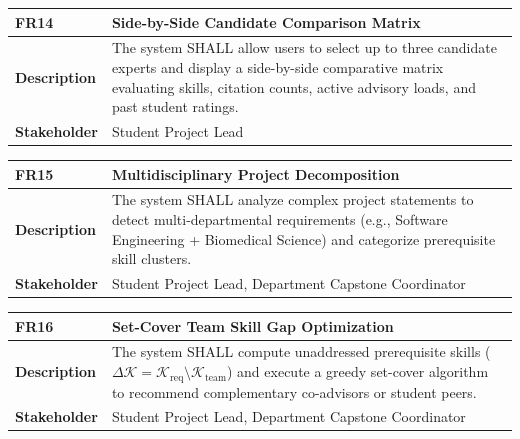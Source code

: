 \begin{table}[H]
\centering
\small
\begin{tabularx}{\textwidth}{|l|X|}
\hline
\rowcolor{lightgray!40} \textbf{FR14} & \textbf{Side-by-Side Candidate Comparison Matrix} \\ \hline
\textbf{Description} & The system SHALL allow users to select up to three candidate experts and display a side-by-side comparative matrix evaluating skills, citation counts, active advisory loads, and past student ratings. \\ \hline
\textbf{Stakeholder} & Student Project Lead \\ \hline
\end{tabularx}
\end{table}

\begin{table}[H]
\centering
\small
\begin{tabularx}{\textwidth}{|l|X|}
\hline
\rowcolor{lightgray!40} \textbf{FR15} & \textbf{Multidisciplinary Project Decomposition} \\ \hline
\textbf{Description} & The system SHALL analyze complex project statements to detect multi-departmental requirements (e.g., Software Engineering + Biomedical Science) and categorize prerequisite skill clusters. \\ \hline
\textbf{Stakeholder} & Student Project Lead, Department Capstone Coordinator \\ \hline
\end{tabularx}
\end{table}

\begin{table}[H]
\centering
\small
\begin{tabularx}{\textwidth}{|l|X|}
\hline
\rowcolor{lightgray!40} \textbf{FR16} & \textbf{Set-Cover Team Skill Gap Optimization} \\ \hline
\textbf{Description} & The system SHALL compute unaddressed prerequisite skills ($\Delta \mathcal{K} = \mathcal{K}_{\text{req}} \setminus \mathcal{K}_{\text{team}}$) and execute a greedy set-cover algorithm to recommend complementary co-advisors or student peers. \\ \hline
\textbf{Stakeholder} & Student Project Lead, Department Capstone Coordinator \\ \hline
\end{tabularx}
\end{table}

